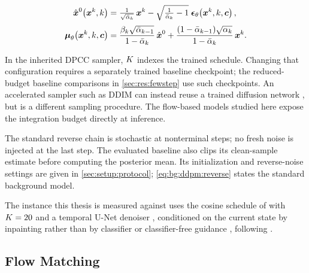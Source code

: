 \begin{align}
  \hat{\boldsymbol{x}}^{0}\!\left(\boldsymbol{x}^{k},k\right)
    &= \tfrac{1}{\sqrt{\bar{\alpha}_{k}}}\,\boldsymbol{x}^{k}
       - \sqrt{\tfrac{1}{\bar{\alpha}_{k}}-1}\;\boldsymbol{\epsilon}_{\theta}\!\left(\boldsymbol{x}^{k},k,\boldsymbol{c}\right),
       \label{eq:bg:ddpm:x0} \\[2pt]
  \boldsymbol{\mu}_{\theta}\!\left(\boldsymbol{x}^{k},k,\boldsymbol{c}\right)
    &= \frac{\beta_{k}\sqrt{\bar{\alpha}_{k-1}}}{1-\bar{\alpha}_{k}}\,\hat{\boldsymbol{x}}^{0}
     + \frac{(1-\bar{\alpha}_{k-1})\sqrt{\alpha_{k}}}{1-\bar{\alpha}_{k}}\,\boldsymbol{x}^{k}.
       \label{eq:bg:ddpm:mean}
\end{align}

In the inherited DPCC sampler, $K$ indexes the trained schedule. Changing that configuration
requires a separately trained baseline checkpoint; the reduced-budget baseline comparisons in
\autoref{sec:res:fewstep} use such checkpoints. An accelerated sampler such as DDIM can instead
reuse a trained diffusion network \parencite{song2021denoising}, but is a different sampling procedure.
The flow-based models studied here expose the integration budget directly at inference.

The standard reverse chain is stochastic at nonterminal steps; no fresh noise is injected at the
last step. The evaluated baseline also clips its clean-sample estimate before computing the
posterior mean. Its initialization and reverse-noise settings are given in
\autoref{sec:setup:protocol}; \eqref{eq:bg:ddpm:reverse} states the standard background model.

The instance this thesis is measured against uses the cosine schedule of
\parencite{nichol2021improved} with $K = 20$ and a temporal U-Net denoiser
\parencite{janner2022planning}, conditioned on the current state by inpainting rather than by
classifier or classifier-free guidance \parencite{dhariwal2021diffusion,ho2022classifier}, following
\parencite[Sec.~6.1]{romer2025diffusion}.

\subsection{Flow Matching}\label{sec:method:fm}

